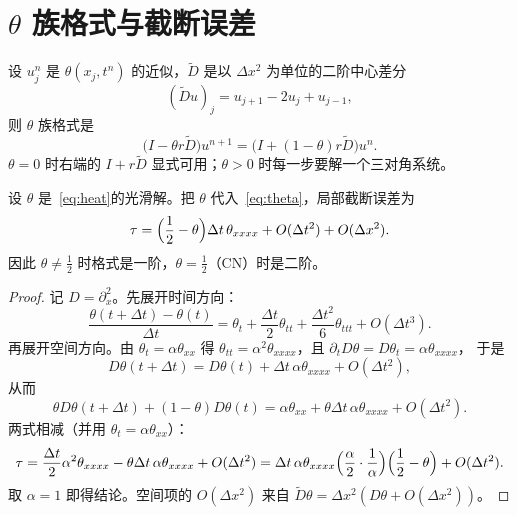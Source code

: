 \section{$\theta$ 族格式与截断误差}

\begin{definition}[$\theta$ 族]
设 $u_j^n$ 是 $\theta(x_j,t^n)$ 的近似，$\tilde D$ 是以 $\Delta x^2$ 为单位的二阶中心差分
\begin{equation}
  (\tilde Du)_j=u_{j+1}-2u_j+u_{j-1},
\end{equation}
则 $\theta$ 族格式是
\begin{equation}
  \bigl(I-\theta r\tilde D\bigr)u^{n+1}=\bigl(I+(1-\theta)r\tilde D\bigr)u^n .
  \label{eq:theta}
\end{equation}
$\theta=0$ 时右端的 $I+r\tilde D$ 显式可用；$\theta>0$ 时每一步要解一个三对角系统。
\end{definition}

\begin{theorem}[截断误差的阶]
\label{thm:trunc}
设 $\theta$ 是~\eqref{eq:heat}的光滑解。把 $\theta$ 代入~\eqref{eq:theta}，局部截断误差为
\begin{equation}
  \tau=\Bigl(\frac12-\theta\Bigr)\Delta t\,\theta_{xxxx}+O(\Delta t^2)+O(\Delta x^2).
\end{equation}
因此 $\theta\ne\frac12$ 时格式是一阶，$\theta=\frac12$（CN）时是二阶。
\end{theorem}

\begin{proof}
记 $D=\partial_x^2$。先展开时间方向：
\begin{equation}
  \frac{\theta(t+\Delta t)-\theta(t)}{\Delta t}
  =\theta_t+\frac{\Delta t}{2}\theta_{tt}+\frac{\Delta t^2}{6}\theta_{ttt}+O(\Delta t^3).
\end{equation}
再展开空间方向。由 $\theta_t=\alpha\theta_{xx}$ 得
$\theta_{tt}=\alpha^2\theta_{xxxx}$，且 $\partial_t D\theta=D\theta_t=\alpha\theta_{xxxx}$，
于是
\begin{equation}
  D\theta(t+\Delta t)=D\theta(t)+\Delta t\,\alpha\theta_{xxxx}+O(\Delta t^2),
\end{equation}
从而
\begin{equation}
  \theta D\theta(t+\Delta t)+(1-\theta)D\theta(t)
  =\alpha\theta_{xx}+\theta\Delta t\,\alpha\theta_{xxxx}+O(\Delta t^2).
\end{equation}
两式相减（并用 $\theta_t=\alpha\theta_{xx}$）：
\begin{equation}
  \tau=\frac{\Delta t}{2}\alpha^2\theta_{xxxx}-\theta\Delta t\,\alpha\theta_{xxxx}+O(\Delta t^2)
  =\Delta t\,\alpha\theta_{xxxx}\Bigl(\frac{\alpha}{2}\cdot\frac{1}{\alpha}\Bigr)\Bigl(\frac12-\theta\Bigr)+O(\Delta t^2).
\end{equation}
取 $\alpha=1$ 即得结论。空间项的 $O(\Delta x^2)$ 来自 $\tilde D\theta=\Delta x^2(D\theta+O(\Delta x^2))$。
\end{proof}

